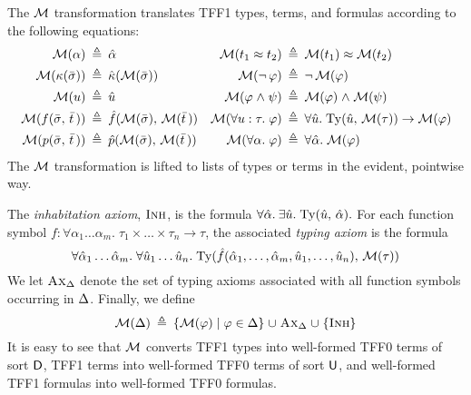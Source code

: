 The $\mathcal{M}$ transformation translates TFF1 types, terms, and formulas
according to the following equations:
\begin{align*}
\mathcal{M}(\alpha) &\:\triangleq\: \hat{\alpha} &
  \mathcal{M}(t_1 \approx t_2) &\:\triangleq\: \mathcal{M}(t_1) \approx \mathcal{M}(t_2) \\
\mathcal{M}(\kappa(\bar{\sigma})) &\:\triangleq\: \hat{\kappa}(\mathcal{M}(\bar{\sigma})) &
  \mathcal{M}(\lnot\, \varphi) &\:\triangleq\: \lnot\, \mathcal{M}(\varphi) \\
\mathcal{M}(u) &\:\triangleq\: \hat{u} &
  \mathcal{M}(\varphi \mathrel{\land} \psi) &\:\triangleq\: \mathcal{M}(\varphi) \mathrel{\land} \mathcal{M}(\psi) \\
\mathcal{M}(f(\bar{\sigma},\,\bar{t}\,)) &\:\triangleq\: \hat{f}(\mathcal{M}(\bar{\sigma}),\,\mathcal{M}(\bar{t}\,)) &
  \mathcal{M}(\forall u \mathrel{:} \tau .\; \varphi) &\:\triangleq\:
  \forall \hat{u} .\; \mathrm{Ty}(\hat{u},\, \mathcal{M}(\tau)) \rightarrow \mathcal{M}(\varphi) \\
\mathcal{M}(p(\bar{\sigma},\,\bar{t}\,)) &\:\triangleq\: \hat{p}(\mathcal{M}(\bar{\sigma}),\,\mathcal{M}(\bar{t}\,)) &
  \mathcal{M}(\forall \alpha .\; \varphi) &\:\triangleq\:
  \forall \hat{\alpha} .\; \mathcal{M}(\varphi)
\end{align*}
%
\newcommand{\AxD}{\text{\sc Ax}_{\DEL}}%
\newcommand{\Inh}{\text{\sc Inh}}%
\newcommand{\Dom}{\mathrm{Dom}}%
%
The $\mathcal{M}$ transformation is lifted to lists of types or terms in the evident,
pointwise way.

The {\em inhabitation axiom}, $\Inh$, is the formula
$\forall \hat{\alpha}.\> \exists \hat{u} .\;
\mathrm{Ty}(\hat{u},\,\hat{\alpha}).$
For each function symbol $f :
\forall \alpha_1\dots\alpha_m .\; \tau_1 \times \dots \times \tau_n \to \tau$,
the associated {\em typing axiom\/} is the formula
$$
\forall \hat{\alpha}_1\dots\hat{\alpha}_m .\;
\forall \hat{u}_1\dots\hat{u}_n .\;
\typeof(\hat{f}(\hat{\alpha}_1,\dots,\hat{\alpha}_m,
\hat{u}_1,\dots,\hat{u}_n),\, \MON(\tau))%
$$
We let $\AxD$ denote the set of typing axioms associated with all function
symbols occurring in $\mathrm{\Delta}$.
%
Finally, we define
$$
\MON(\DEL) \eqdef \{ \MON(\varphi) \vb \varphi \in \DEL \} \mathrel\cup
\AxD \mathrel\cup \{ \Inh \}%
$$
%
It is easy to see that $\mathcal{M}$ converts TFF1 types into well-formed TFF0 terms of
sort $\mathsf{D}$, TFF1 terms into well-formed TFF0 terms of sort $\mathsf{U}$, and
well-formed %
TFF1 formulas into well-formed TFF0 formulas.


